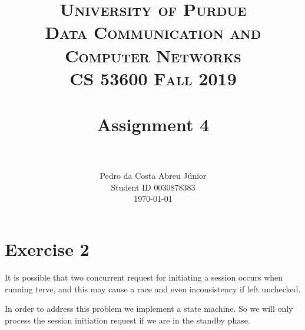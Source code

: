 \documentclass[paper=a4, fontsize=11pt]{scrartcl}
\title{
		\usefont{OT1}{bch}{b}{n}
		\normalfont \normalsize \textsc{University of Purdue\\
      Data Communication and Computer Networks\\
      CS 53600 Fall 2019} \\ [25pt]
		\horrule{0.5pt} \\[0.4cm]
		\huge Assignment 4\\
		\horrule{2pt} \\[0.5cm]
}
\author{
		\normalfont\normalsize Pedro da Costa Abreu Júnior\\ [-5pt]
    \normalsize Student ID 0030878383\\[-5pt]
    \normalsize \today
}
\date{}
\numberwithin{equation}{section}		%
\numberwithin{figure}{section}			%
\numberwithin{table}{section}				%
\begin{document}
\maketitle

\section*{Exercise 2}
It is possible that two concurrent request for
initiating a session occurs when running terve,
and this may cause a race and even inconsistency if left unchecked.

In order to address this problem we implement a state machine.
So we will only process the session initiation request if
we are in the standby phase.

\end{document}
